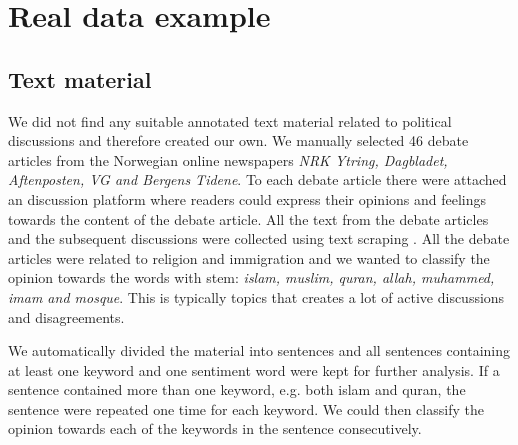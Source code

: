 \documentclass[11pt]{article}
\begin{document}
\section{Real data example}
\label{sec:results}

\subsection{Text material}

We did not find any suitable annotated text material related to political discussions and therefore created our own. We manually selected 46 debate articles from the Norwegian online newspapers \textit{NRK Ytring, Dagbladet, Aftenposten, VG and Bergens Tidene}. To each debate article there were attached an discussion platform where readers could express their opinions and feelings towards the content of the debate article. All the text from the debate articles and the subsequent discussions were collected using text scraping \cite{Hammer13}. All the debate articles were related to religion and immigration and we wanted to classify the opinion towards the words with stem: \textit{islam, muslim, quran, allah, muhammed, imam and mosque}. This is typically topics that creates a lot of active discussions and disagreements.

We automatically divided the material into sentences and all sentences containing at least one keyword and one sentiment word were kept for further analysis. If a sentence contained more than one keyword, e.g. both islam and quran, the sentence were repeated one time for each keyword. We could then classify the opinion towards each of the keywords in the sentence consecutively. 
\end{document}
